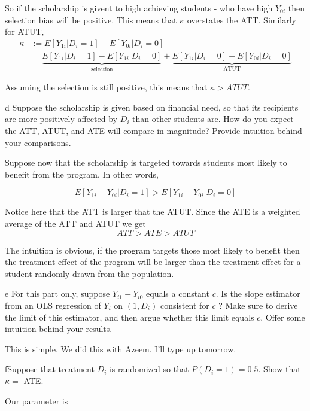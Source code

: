 \documentclass{article}
\begin{document}
So if the scholarship is givent to high achieving students - who have
high $Y_{0i}$ then selection bias will be positive. This means that
$\kappa$ overstates the ATT. Similarly for ATUT,
\begin{align*}
\kappa & :=E\left[Y_{1i}|D_{i}=1\right]-E\left[Y_{0i}|D_{i}=0\right]\\
 & =\underbrace{E\left[Y_{1i}|D_{i}=1\right]-E\left[Y_{1i}|D_{i}=0\right]}_{\text{selection}}+\underbrace{E\left[Y_{1i}|D_{i}=0\right]-E\left[Y_{0i}|D_{i}=0\right]}_{\text{ATUT}}
\end{align*}

Assuming the selection is still positive, this means that $\kappa>ATUT$.\begin{problem}{d} Suppose the scholarship is given based on financial need, so that its recipients are more positively affected by $D_{i}$ than other students are. How do you expect the ATT, ATUT, and ATE will compare in magnitude? Provide intuition behind your comparisons.
\end{problem}

Suppose now that the scholarship is targeted towards students most
likely to benefit from the program. In other words,

\[
E\left[Y_{1i}-Y_{0i}|D_{i}=1\right]>E\left[Y_{1i}-Y_{0i}|D_{i}=0\right]
\]

Notice here that the ATT is larger that the ATUT. Since the ATE is
a weighted average of the ATT and ATUT we get
\[
ATT>ATE>ATUT
\]

The intuition is obvious, if the program targets those most likely
to benefit then the treatment effect of the program will be larger
than the treatment effect for a student randomly drawn from the population.
\begin{problem}{e} For this part only, suppose $Y_{i 1}-Y_{i 0}$ equals a constant $c$. Is the slope estimator from an OLS regression of $Y_{i}$ on $\left(1, D_{i}\right)$ consistent for $c$ ? Make sure to derive the limit of this estimator, and then argue whether this limit equals $c$. Offer some intuition behind your results. 
\end{problem}

This is simple. We did this with Azeem. I'll type up tomorrow. \begin{problem}{f}Suppose that treatment $D_{i}$ is randomized so that $P\left(D_{i}=1\right)=0.5$. Show that $\kappa=$ ATE.
\end{problem}

Our parameter is 
\end{document}
